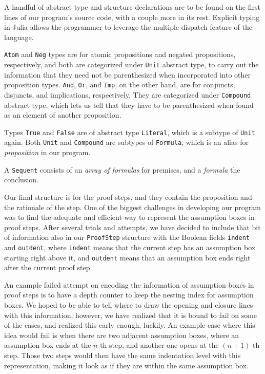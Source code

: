 \documentclass{article}
\begin{document}
A handful of abstract type and structure declarations are to be found
on the first lines of our program's source code, with a couple more
in its rest. Explicit typing in Julia allows the programmer to leverage
the multiple-dispatch feature of the language.

\verb|Atom| and \verb|Neg| types are for atomic propositions and
negated propositions, respectively, and both are categorized under \verb|Unit|
abstract type, to carry out the information that they need not be
parenthesized when incorporated into other proposition types.
\verb|And|, \verb|Or|, and \verb|Imp|, on the other hand, are for
conjuncts, disjuncts, and implications, respectively. They are
categorized under \verb|Compound| abstract type, which lets us tell
that they have to be parenthesized when found as an element of another
proposition.

Types \verb|True| and \verb|False| are of abstract type \verb|Literal|,
which is a subtype of \verb|Unit| again. Both \verb|Unit| and
\verb|Compound| are subtypes of \verb|Formula|, which is an alias
for \textit{proposition} in our program.

A \verb|Sequent| consists of an \textit{array of formulas} for premises, and
a \textit{formula} the conclusion.

Our final structure is for the proof steps, and they contain
the proposition and the rationale of the step. One of the biggest
challenges in developing our program was to find the adequate
and efficient way to represent the assumption boxes in proof steps.
After several trials and attempts, we have decided to include
that bit of information also in our \verb|ProofStep| structure
with the Boolean fields \verb|indent| and \verb|outdent|, where
\verb|indent| means that the current step has an assumption box
starting right above it, and \verb|outdent| means that an assumption
box ends right after the current proof step.

An example failed attempt on encoding the information of assumption
boxes in proof steps is to have a depth counter to keep the nesting
index for assumption boxes. We hoped to be able to tell where to
draw the opening and closure lines with this information, however,
we have realized that it is bound to fail on some of the cases,
and realized this early enough, luckily. An example case where this
idea would fail is when there are two adjacent assumption boxes,
where an assumption box ends at the $n$-th step, and another one
opens at the $(n + 1)$-th step. Those two steps would then have
the same indentation level with this representation, making it look
as if they are within the same assumption box.
\end{document}
